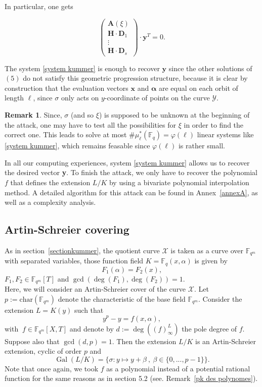 \documentclass[10pt]{article}
\theoremstyle{definition}
\newtheorem{rq1}[thm]{Remark}
\theoremstyle{definition}
\theoremstyle{definition}
\newcommand{\s}{\vspace{0.3cm}}
\newcommand{\cd}{\cdot}
\newcommand{\fqm}{\mathbb{F}_{q^m}}
\newcommand{\fq}{\mathbb{F}_q}
\newcommand{\X}{\mathcal{X}}
\newcommand{\Y}{\mathcal{Y}}
\newcommand{\Gal}{\operatorname{Gal}}
\begin{document}
In particular, one gets


\begin{equation} \label{system kummer}
\begin{pmatrix}
\mathbf{A}(\xi) \\
\mathbf{H} \cd \mathbf{D}_1 \\
\vdots \\
\mathbf{H} \cd \mathbf{D}_s
\end{pmatrix}
\cd \mathbf{y}^T = 0.
\end{equation}

The system \eqref{system kummer} is enough to recover $\mathbf{y}$ since the other solutions of $(5)$ do not satisfy this geometric progression structure, because it is clear by construction that the evaluation vectors $\mathbf{x}$ and $\boldsymbol{\alpha}$ are equal on each orbit of length $\ell$, since $\sigma$ only acts on $y$-coordinate of points on the curve $\Y$. 

\s

\begin{rq1} Since, $\sigma$ (and so $\xi$) is supposed to be unknown at the beginning of the attack, one may have to test all the possibilities for $\xi$ in order to find the correct one. This leads to solve at most $\#\mu^*_{\ell}(\fq) = \varphi(\ell)$ linear systems like \eqref{system kummer}, which remains feasable since $\varphi(\ell)$ is rather small.
\end{rq1}

\s

In all our computing experiences, system \eqref{system kummer} allows us to recover the desired vector \textbf{y}. To finish the attack, we only have to recover the polynomial $f$ that defines the extension $L/K$ by using a bivariate polynomial interpolation method. A detailed algorithm for this attack can be found in Annex~\ref{annexA}, as well as a complexity analysis.

\s


\subsection{Artin-Schreier covering} \label{sectionas}

\s

As in section~\ref{sectionkummer}, the quotient curve $\X$ is taken as a curve over $\fqm$ with separated variables, those function field $K = \fq(x,\alpha)$ is given by 
\[F_1(\alpha) = F_2(x),\] 
$F_1,F_2 \in \fqm[T]$ and $\gcd(\deg(F_1),\deg(F_2))=1$. \\ 
Here, we will consider an Artin-Schreier cover of the curve $\X$.
Let $p:=\mathrm{char}(\fqm)$ denote the characteristic of the base field $\fqm$. Consider the extension $L=K(y)$ such that
\[y^p-y = f(x,\alpha),\]
with $\ f \in \fqm[X,T]$ and denote by \color{purple} $d:=\deg\left((f)^L_{\infty}\right)$ the pole degree of $f$.\color{black} Suppose also that $\gcd(d,p)=1$. Then the extension $L/K$ is an Artin-Schreier extension, cyclic of order $p$ and 
\[\Gal(L/K) = \{ \sigma : y \mapsto y + \beta \ , \ \beta \in \{0,...,p-1\}\}.\]
Note that once again, we took $f$ as a polynomial instead of a potential rational function for the same reasons as in section 5.2 (see. Remark~\ref{pk des polynomes}).
\end{document}
